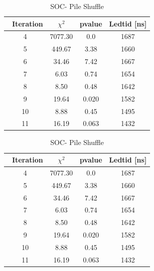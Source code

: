 \documentclass[swedish,a4paper]{article}
\begin{document}
\begin{table}[H]
        \vspace{2em}
        
        \begin{subtable}[h]{0.45\textwidth}
        \caption{SOC- Pile Shuffle}
        \centering
        \begin{tabular}{c|c|c|c}
		$\phantom{\bigg|}$ Iteration & $\chi^2$  & pvalue & Ledtid [ns]

        \\ \hline \hline
        4 & 7077.30 & 0.0 & 1687 
        \\ \hline
        5 & 449.67 & 3.38 & 1660 
        \\ \hline
        6 & 34.46 & 7.42 & 1667
        \\ \hline
        7 & 6.03 & 0.74 & 1654 
        \\ \hline
        8 & 8.50 & 0.48 & 1642 
        \\ \hline
        9 & 19.64 & 0.020 & 1582 
        \\ \hline
        10 & 8.88 & 0.45 & 1495 
        \\ \hline
        11 & 16.19 & 0.063 & 1432 
	\end{tabular}
        \end{subtable}
        \hfill
        \begin{subtable}[h]{0.45\textwidth}
        \caption{SOC- Pile Shuffle}
        \centering
        \begin{tabular}{c|c|c|c}
		$\phantom{\bigg|}$ Iteration & $\chi^2$  & pvalue & Ledtid [ns]

        \\ \hline \hline
        4 & 7077.30 & 0.0 & 1687 
        \\ \hline
        5 & 449.67 & 3.38 & 1660 
        \\ \hline
        6 & 34.46 & 7.42 & 1667
        \\ \hline
        7 & 6.03 & 0.74 & 1654 
        \\ \hline
        8 & 8.50 & 0.48 & 1642 
        \\ \hline
        9 & 19.64 & 0.020 & 1582 
        \\ \hline
        10 & 8.88 & 0.45 & 1495 
        \\ \hline
        11 & 16.19 & 0.063 & 1432 
	\end{tabular}
        \end{subtable}
        
\end{table}
\end{document}
